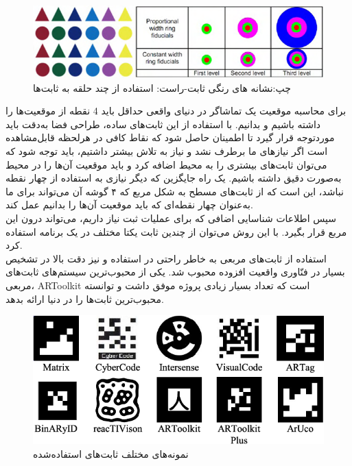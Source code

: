 \begin{itemize}
	\begin{figure}
		\centering
		\includegraphics[width=1\linewidth]{image/fiducial}
		\caption {چپ:نشانه های رنگی ثابت-راست: استفاده از چند حلقه به ثابت‌ها\cite{cho1998multi}}
		\label{fig:fiducial}
	\end{figure}
	برای محاسبه موقعیت یک تماشاگر در دنیای واقعی حداقل باید 4 نقطه از موقعیت‌ها را داشته باشیم و بدانیم. با استفاده از این ثابت‌های ساده، طراحی فضا به‌دقت باید موردتوجه قرار گیرد تا اطمینان حاصل شود که نقاط کافی در هرلحظه قابل‌مشاهده است اگر نیازهای ما برطرف نشد و نیاز به تلاش بیشتر داشتیم، باید توجه شود که می‌توان ثابت‌های بیشتری را به محیط اضافه کرد و باید موقعیت آن‌ها را در محیط به‌صورت دقیق داشته باشیم. یک راه جایگزین که دیگر نیازی به استفاده از چهار نقطه نباشد، این است که از ثابت‌های مسطح به شکل مربع که ۴ گوشه آن می‌تواند برای ما به‌عنوان چهار نقطه‌ای که باید موقعیت آن‌ها را بدانیم عمل کند.
	\\
	سپس اطلاعات شناسایی اضافی که برای عملیات ثبت نیاز داریم، می‌تواند درون این مربع قرار بگیرد. با این روش می‌توان از چندین ثابت یکتا مختلف در یک برنامه استفاده کرد.
	\\
	استفاده از ثابت‌های مربعی  به خاطر راحتی در استفاده و نیز دقت بالا در تشخیص بسیار در فنّاوری واقعیت افزوده محبوب شد. یکی از محبوب‌ترین سیستم‌های ثابت‌های مربعی، ARToolkit است که تعداد بسیار زیادی پروژه موفق داشت و توانسته محبوب‌ترین ثابت‌ها را در دنیا ارائه بدهد\cite{comport2006real}.
		\begin{figure}
		\centering
		\includegraphics[width=1\linewidth]{image/ARtoolkit}
		\caption {نمونه‌های مختلف ثابت‌های استفاده‌شده  \protect{}}
		\label{fig:ARtoolkit}
	\end{figure}
	

\end{itemize}
